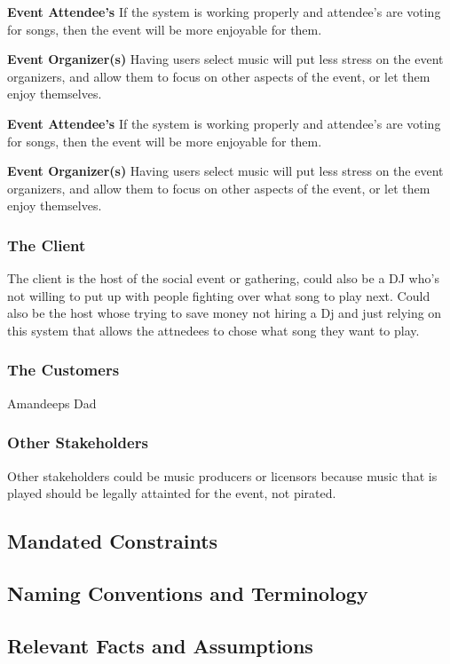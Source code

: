 \documentclass[12pt, titlepage]{article}
\begin{document}
\textbf{Event Attendee's}
If the system is working properly and attendee's are voting for songs, then
the event will be more enjoyable for them.

\textbf{Event Organizer(s)}
Having users select music will put less stress on the event organizers, and
allow them to focus on other aspects of the event, or let them enjoy
themselves.

\textbf{Event Attendee's}
If the system is working properly and attendee's are voting for songs, then
the event will be more enjoyable for them.

\textbf{Event Organizer(s)}
Having users select music will put less stress on the event organizers, and
allow them to focus on other aspects of the event, or let them enjoy
themselves.

\subsubsection{The Client}

The client is the host of the social event or gathering, could also be a DJ
who's not willing to put up with people fighting over what song to play next.
Could also be the host whose trying to save money not hiring a Dj and just
relying on this system that allows the attnedees to chose what song they want
to play.
\subsubsection{The Customers}
Amandeeps Dad

\subsubsection{Other Stakeholders}
Other stakeholders could be music producers or licensors because music that is
played should be legally attainted for the event, not pirated.

\subsection{Mandated Constraints}

\subsection{Naming Conventions and Terminology}

\subsection{Relevant Facts and Assumptions}
\end{document}
